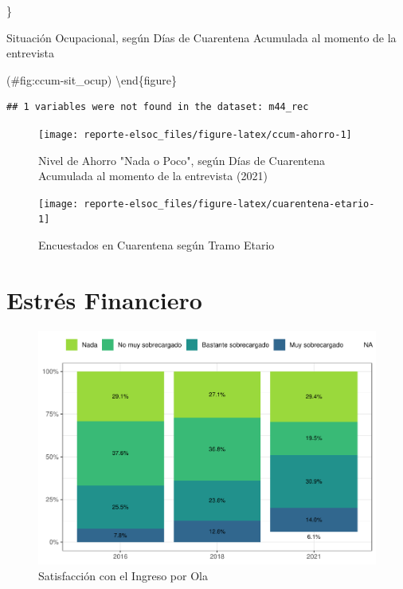 \documentclass[
  12pt,
  openany]{book}
\begin{document}
\}

\caption{Situación Ocupacional, según Días de Cuarentena Acumulada al momento de la entrevista}

(\#fig:ccum-sit\_ocup)
\textbackslash end\{figure\}

\begin{verbatim}
## 1 variables were not found in the dataset: m44_rec
\end{verbatim}

\begin{figure}

{\centering \texttt{[image: reporte-elsoc\_files/figure-latex/ccum-ahorro-1]} 

}

\caption{Nivel de Ahorro "Nada o Poco", según Días de Cuarentena Acumulada al momento de la entrevista (2021)}\label{fig:ccum-ahorro}
\end{figure}

\begin{figure}

{\centering \texttt{[image: reporte-elsoc\_files/figure-latex/cuarentena-etario-1]} 

}

\caption{Encuestados en Cuarentena según Tramo Etario}\label{fig:cuarentena-etario}
\end{figure}

\hypertarget{estruxe9s-financiero}{%
\section{Estrés Financiero}\label{estruxe9s-financiero}}

\begin{figure}

{\centering \includegraphics{reporte-elsoc_files/figure-latex/satisfaccion-wave-1} 

}

\caption{Satisfacción con el Ingreso por Ola}\label{fig:satisfaccion-wave}
\end{figure}
\end{document}
